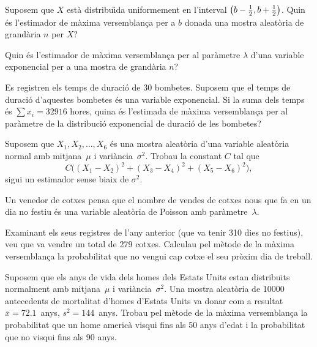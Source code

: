 \begin{prob}
{Suposem que $X$ est\`a distribu\"{\i}da uniformement en l'interval
\hbox{$\left(b-{1\over 2},b+{1\over 2}\right)$.} Quin \'es l'estimador de m\`axima
versemblan\c{c}a per a $b$ donada una mostra aleat\`oria de grand\`aria $n$ per $X$?}

\end{prob}

\begin{prob}
{Quin \'es l'estimador de m\`axima versemblan\c{c}a per al par\`ametre
$\lambda$ d'una variable exponencial per a una mostra de 
grand\`aria $n$?}
\end{prob}

\begin{prob}
{Es registren els temps de duraci\'o de 30 bombetes.
 Suposem que el
temps de duraci\'o d'aquestes bombetes \'es una variable exponencial. Si
la suma dels temps \'es $\sum x_i =32916$ hores, quina \'es l'estimada de m\`axima
versemblan\c{c}a per al par\`ametre de la distribuci\'o exponencial de duraci\'o de les
bombetes?}
\end{prob}


\begin{prob}
{Suposem que $X_1,X_2,\ldots,X_6$ \'es una mostra aleat\`oria d'una
variable aleat\`oria normal
 amb mitjana~$\mu$
 i vari\`ancia~$\sigma^2$.
 Trobau la
constant $C$ tal que $$C\bigl({(X_1 -X_2)}^2 +{(X_3 -X_4)}^2 + 
 {(X_5 -X_6)}^2\bigr),$$sigui un estimador sense biaix
 de $\sigma^2$.}
\end{prob}


\begin{prob}
{Un venedor de cotxes pensa que el nombre de vendes 
de cotxes nous que fa en un dia no festiu 
\'es una variable aleat\`oria de Poisson amb par\`ametre~$\lambda$.
 
Examinant els seus registres de l'any anterior (que va tenir 310
dies no festius), veu que va vendre un total de 279 cotxes. Calculau pel
m\`etode de la m\`axima versemblan\c{c}a la probabilitat que no vengui 
cap cotxe el
seu pr\`oxim dia de treball.}
\end{prob}

\begin{prob}
{Suposem que els anys de vida dels homes dels Estats Units
 estan
distribu\"{\i}ts normalment amb mitjana~$\mu$
 i vari\`ancia~$\sigma^2$. Una mostra
aleat\`oria de 10000 antecedents de mortalitat d'homes d'Estats Units va donar
com a resultat \hbox{$\overline{x}=72.1$ anys,} \hbox{$s^2 =144$ anys.}
Trobau pel m\`etode de la m\`axima versemblan\c{c}a la probabilitat que 
un home americ\`a visqui fins als 50 anys d'edat i la probabilitat que no visqui fins
als 90 anys.}
\end{prob}

